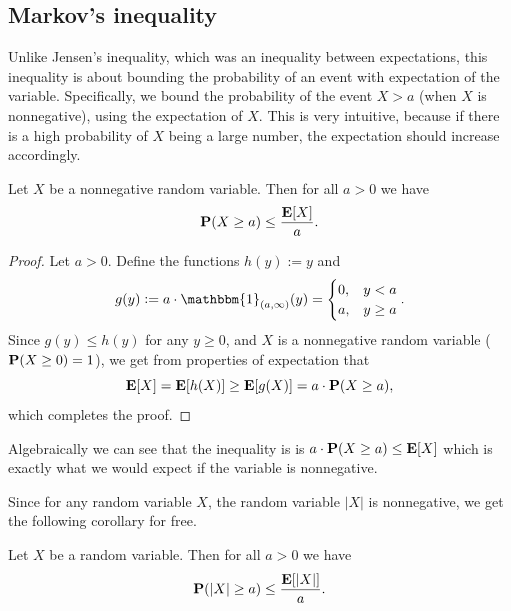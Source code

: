 \documentclass[11pt,a4paper]{article}
\begin{document}
\subsection{Markov's inequality}
Unlike Jensen's inequality, which was an inequality between expectations,
this inequality is about bounding the probability of an event
with expectation of the variable.
Specifically, we bound the probability of the event $X > a$
(when $X$ is nonnegative), using the expectation of $X$.
This is very intuitive, because if there is a high probability of $X$
being a large number, the expectation should increase accordingly.

\begin{theorem}
  Let $X$ be a nonnegative random variable.
  Then for all $a > 0$ we have
  \[
    \mathbf{P}(X \geq a) \leq
    \frac{\mathbf{E}[X]}{a}.
  \]
\end{theorem}
\begin{proof}
  Let $a > 0$.
  Define the functions $h(y) := y$ and
  \[
    g(y) :=
    a \cdot \mathbbm{1}_{(a,\infty)}(y) =
    \begin{cases}
      0, &y < a \\
      a, &y \geq a
    \end{cases}.
  \]
  Since $g(y) \le h(y)$ for any $y \geq 0$, and $X$ is a nonnegative
  random variable ($\mathbf{P}(X \geq 0) = 1$),
  we get from properties of expectation that
  \[
    \mathbf{E}[X] =
    \mathbf{E}[h(X)] \geq
    \mathbf{E}[g(X)] =
    a \cdot \mathbf{P}(X \geq a),
  \]
  which completes the proof.
\end{proof}

\begin{remark}
  Algebraically we can see that the inequality is
  is $a \cdot \mathbf{P}(X \geq a) \le \mathbf{E}[X]$ which is exactly what we would
  expect if the variable is nonnegative.
\end{remark}

\begin{remark}
  Since for any random variable $X$,
  the random variable $|X|$ is nonnegative,
  we get the following corollary for free.
\end{remark}

\begin{corollary}
  Let $X$ be a random variable.
  Then for all $a > 0$ we have
  \[
    \mathbf{P}(|X|\geq a) \leq
    \frac{\mathbf{E}[|X|]}{a}.
  \]
\end{corollary}
\end{document}
